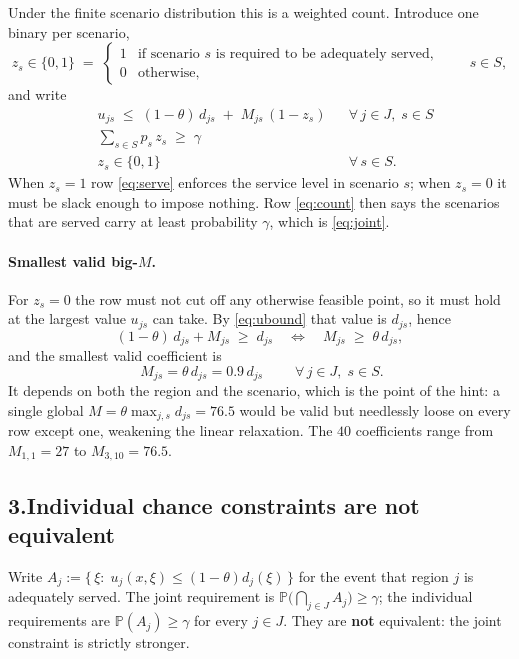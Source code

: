 \documentclass[11pt]{article}
\theoremstyle{definition}\newtheorem*{definition}{Definition}
\theoremstyle{definition}
\begin{document}
Under the finite scenario distribution this is a weighted count.
Introduce one binary per scenario,
\[
  z_s \in \{0,1\} \;=\;
  \begin{cases}
    1 & \text{if scenario $s$ is required to be adequately served},\\
    0 & \text{otherwise},
  \end{cases}
  \qquad s \in S,
\]
and write
\begin{align}
  & u_{js} \;\le\; (1-\theta)\, d_{js} \;+\; M_{js}\,(1 - z_s)
    && \forall\, j \in J,\; s \in S \label{eq:serve}\\
  & \sum_{s \in S} p_s\, z_s \;\ge\; \gamma \label{eq:count}\\
  & z_s \in \{0,1\} && \forall\, s \in S .
\end{align}
When $z_s = 1$ row \eqref{eq:serve} enforces the service level in
scenario $s$; when $z_s = 0$ it must be slack enough to impose nothing.
Row \eqref{eq:count} then says the scenarios that are served carry at
least probability $\gamma$, which is \eqref{eq:joint}.

\paragraph{Smallest valid big-$M$.} For $z_s = 0$ the row must not cut
off any otherwise feasible point, so it must hold at the largest value
$u_{js}$ can take. By \eqref{eq:ubound} that value is $d_{js}$, hence
\[
  (1-\theta)\,d_{js} + M_{js} \;\ge\; d_{js}
  \quad\Longleftrightarrow\quad
  M_{js} \;\ge\; \theta\, d_{js},
\]
and the smallest valid coefficient is
\begin{equation}
  \boxed{\;M_{js} = \theta\, d_{js} = 0.9\, d_{js}\;}
  \qquad \forall\, j \in J,\; s \in S .
  \label{eq:M}
\end{equation}
It depends on both the region and the scenario, which is the point of the
hint: a single global $M = \theta \max_{j,s} d_{js} = 76.5$ would be
valid but needlessly loose on every row except one, weakening the linear
relaxation. The $40$ coefficients range from $M_{1,1} = 27$ to
$M_{3,10} = 76.5$.

\subsection*{3.\quad Individual chance constraints are not equivalent}

Write $A_j := \{\, \xi :\; u_j(x,\xi) \le (1-\theta) d_j(\xi) \,\}$ for
the event that region $j$ is adequately served. The joint requirement is
$\mathbb{P}\big(\bigcap_{j \in J} A_j\big) \ge \gamma$; the individual
requirements are $\mathbb{P}(A_j) \ge \gamma$ for every $j \in J$. They
are \textbf{not} equivalent: the joint constraint is strictly stronger.
\end{document}
